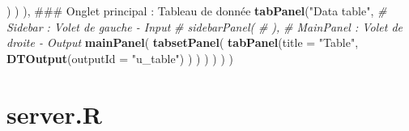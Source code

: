 \documentclass[]{report}
\newenvironment{Shaded}{\begin{snugshade}}{\end{snugshade}}
\newcommand{\KeywordTok}[1]{\textcolor[rgb]{0.13,0.29,0.53}{\textbf{#1}}}
\newcommand{\DataTypeTok}[1]{\textcolor[rgb]{0.13,0.29,0.53}{#1}}
\newcommand{\StringTok}[1]{\textcolor[rgb]{0.31,0.60,0.02}{#1}}
\newcommand{\CommentTok}[1]{\textcolor[rgb]{0.56,0.35,0.01}{\textit{#1}}}
\newcommand{\NormalTok}[1]{#1}
\begin{document}
\begin{Shaded}
\begin{Highlighting}[]
\NormalTok{               )}
\NormalTok{             )}
\NormalTok{    ),}
\NormalTok{    ### Onglet principal : Tableau de donnée}
    \KeywordTok{tabPanel}\NormalTok{(}\StringTok{"Data table"}\NormalTok{,}
             \CommentTok{# Sidebar : Volet de gauche - Input}
             \CommentTok{# sidebarPanel(}
             \CommentTok{# ),}
             \CommentTok{# MainPanel : Volet de droite - Output}
             \KeywordTok{mainPanel}\NormalTok{(}
               \KeywordTok{tabsetPanel}\NormalTok{(}
                 \KeywordTok{tabPanel}\NormalTok{(}\DataTypeTok{title =} \StringTok{"Table"}\NormalTok{, }\KeywordTok{DTOutput}\NormalTok{(}\DataTypeTok{outputId =} \StringTok{"u_table"}\NormalTok{)}
\NormalTok{                          )}
\NormalTok{               )}
\NormalTok{             )}
\NormalTok{    )}
\NormalTok{  )}
\NormalTok{)}
\end{Highlighting}
\end{Shaded}

\section{server.R}\label{server.r}
\end{document}
